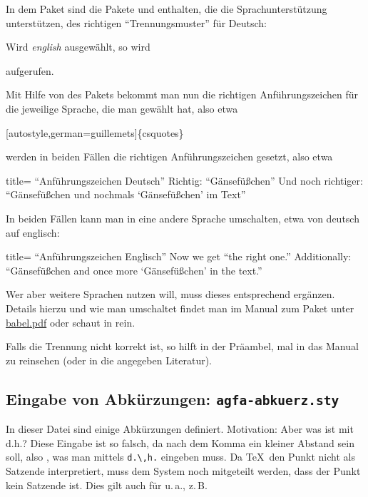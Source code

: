 In dem \og Paket sind die Pakete  und  enthalten, die die Sprachunterstützung unterstützen, \inkl des richtigen \enquote{Trennungsmuster} für Deutsch:
%
\begin{tcblisting}{listing only}
\usepackage}[english,main=ngerman]{babel}
\babelprovide[hyphenrules=ngerman-x-latest]{ngerman}
\end{tcblisting}
%
Wird \emph{english} ausgewählt, so wird 
%
\begin{tcblisting}{listing only}
\{usepackage}[ngermen,main=english]{babel}
\end{tcblisting}
%
aufgerufen.

Mit Hilfe von des Pakets  bekommt man nun die richtigen Anführungszeichen für die jeweilige Sprache, die man gewählt hat, also etwa 
%
\begin{tcolorbox}
[autostyle,german=guillemets]\{csquotes\}
\end{tcolorbox}
%
werden in beiden Fällen die richtigen Anführungszeichen gesetzt, also etwa
%
\begin{tcblisting}{title= \enquote{Anführungszeichen Deutsch}}
Richtig: \enquote{Gänsefüßchen}
Und noch richtiger: \enquote{Gänsefüßchen und nochmals \enquote{Gänsefüßchen} im Text}
\end{tcblisting}
%
In beiden Fällen kann man in eine andere Sprache umschalten, etwa von deutsch auf englisch:
%
\begin{otherlanguage}{english}
\begin{tcblisting}{title= \enquote{Anführungszeichen Englisch}}
Now we get \enquote{the right one.}
Additionally: \enquote{Gänsefüßchen and once more \enquote{Gänsefüßchen} in the text.}
\end{tcblisting}
\end{otherlanguage}
%
Wer aber weitere Sprachen nutzen will, muss dieses entsprechend ergänzen.
Details hierzu und wie man umschaltet findet man im Manual zum Paket  unter 
\href{https://ctan.ebinger.cc/tex-archive/macros/latex/required/babel/base/babel.pdf}{babel.pdf} oder schaut in \textcite[3.7.2]{voss:2012a} rein.

Falls die Trennung nicht korrekt ist, so hilft  in der Präambel, mal in das Manual zu  reinsehen (oder in die angegeben Literatur).
\subsection{Eingabe von Abkürzungen: \texttt{agfa-abkuerz.sty}}\label{agfa-abkuerz}
In dieser Datei sind einige Abkürzungen definiert. 
Motivation: Aber was ist mit d.h.? Diese Eingabe ist so falsch, da nach dem Komma ein kleiner Abstand sein soll, also \dh, was man mittels \verb|d.\,h.| eingeben muss.
Da \TeX\ den Punkt nicht als Satzende interpretiert, muss dem System noch mitgeteilt werden, dass der Punkt kein Satzende ist.
Dies gilt auch für u.\,a., z.\,B. \etc

